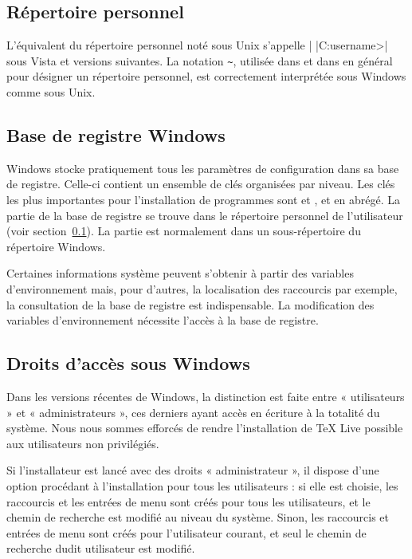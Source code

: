 \documentclass[german, english, french]{article}
\renewcommand{\TL}{\TeX{} Live\xspace}%
\begin{document}
\subsection{Répertoire personnel}
\label{sec:winhome}

L'équivalent du répertoire personnel noté  sous Unix s'appelle
|%
|C:\Utilisateurs\<username>| sous Vista et versions suivantes.  La notation
\verb|~|, utilisée dans  et dans \KPS{} en général pour
désigner un répertoire personnel, est correctement interprétée sous Windows
comme sous Unix.


\subsection{Base de registre Windows}
\label{sec:registry}

Windows stocke pratiquement tous les paramètres de configuration dans sa base de
registre. Celle-ci contient un ensemble de clés organisées par niveau.  Les clés
les plus importantes pour l'installation de programmes sont
 et ,  et
 en abrégé. La partie  de la base de registre se trouve
dans le répertoire personnel de l'utilisateur (voir
section~\ref{sec:winhome}). La partie  est normalement dans un
sous-répertoire du répertoire Windows.

Certaines informations système peuvent s'obtenir à partir des variables
d'environnement mais, pour d'autres, la localisation des raccourcis par exemple,
la consultation de la base de registre est indispensable.  La modification des
variables d'environnement nécessite l'accès à la base de registre.


\subsection{Droits d'accès sous Windows}
\label{sec:winpermissions}

Dans les versions récentes de Windows, la distinction est faite entre
« utilisateurs » et « administrateurs », ces derniers ayant accès en écriture
à la totalité du système. Nous nous sommes efforcés de rendre l'installation de
\TL{} possible aux utilisateurs non privilégiés.

Si l'installateur est lancé avec des droits « administrateur », il dispose d'une
option procédant à l'installation pour tous les utilisateurs : si elle est
choisie, les raccourcis et les entrées de menu sont créés pour tous les
utilisateurs, et le chemin de recherche est modifié au niveau du système. Sinon,
les raccourcis et entrées de menu sont créés pour l'utilisateur courant, et seul
le chemin de recherche dudit utilisateur est modifié.
\end{document}
